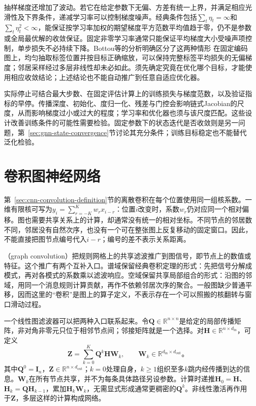 抽样梯度还增加了波动。若它在给定参数下无偏、方差有统一上界，并满足相应光滑性及下界条件，递减学习率可以控制梯度噪声。经典条件包括$\sum_t\eta_t=\infty$和$\sum_t\eta_t^2<\infty$，能保证按学习率加权的期望梯度平方范数平均值趋于零，仍不是参数或全局最优解的收敛保证。固定非零学习率通常只能保证平均梯度大小受噪声项控制，单步损失不必持续下降。Bottou等的分析明确区分了这两种情形 在固定编码图上，均匀抽取标签位置并按目标正确缩放，可以保持完整标签平均损失的无偏梯度；邻居采样经过多层非线性却未必如此。须先确定究竟在优化哪个目标，才能使用相应收敛结论；上述结论也不能自动推广到任意自适应优化器。

实际停止可结合最大步数、在固定评估计算上的训练损失与梯度范数，以及验证指标的早停。传播深度、初始化、度归一化、残差与门控会影响链式Jacobian的尺度，从而影响梯度过小或过大的程度；学习率和优化器也须与该尺度匹配。这些设计改善训练条件的可能性需要检验。固定参数下的状态迭代是否收敛则是另一问题，第~\ref{sec:gnn-state-convergence}节讨论其充分条件；训练目标稳定也不能替代泛化检验。

\section{卷积图神经网络}
\label{sec:gnn-convolutional}

第~\ref{sec:cnn-convolution-definition}节的离散卷积在每个位置使用同一组核系数。一维有限核可写为$y_i=\sum_{r=-K}^{K}w_r x_{i-r}$：位置$i$改变时，系数$w_r$仍对应同一个相对偏移。图也需要共享关系上的计算，却通常没有统一的相对坐标。不同节点的邻居数不同，邻居没有自然次序，也没有一个可在整张图上反复移动的固定窗口。因此，不能直接把图节点编号代入$i-r$；编号的差不表示关系距离。

（graph convolution）把规则网格上的共享滤波推广到图信号，即节点上的数值或特征。这个推广有两个互补入口。谱域保留经典卷积定理的形式：先把信号分解成模式，再对各模式的系数乘以滤波响应。空域保留共享局部组合的形式：沿图的邻域，用同一个消息规则计算贡献，再作不依赖邻居次序的聚合。一般图缺少普通平移，因而这里的“卷积”是图上的算子定义，不表示存在一个可以照搬的核翻转与窗口滑动过程。

一个线性图滤波器可以把两种入口联系起来。令$\bm{Q}\in\mathbb{R}^{n\times n}$是给定的局部传播矩阵，非对角非零元只位于相邻节点间；邻接矩阵就是一个选择。对$\bm{H}\in\mathbb{R}^{n\times d_{\mathrm{in}}}$，可定义
\begin{equation}
  \bm{Z}=\sum_{k=0}^{K}\bm{Q}^{k}\bm{H}\bm{W}_k,
  \qquad \bm{W}_k\in\mathbb{R}^{d_{\mathrm{in}}\times d_{\mathrm{out}}}\text{。}
  \label{eq:gnn-polynomial-convolution}
\end{equation}
其中$\bm{Q}^0=\bm{I}_n$，$\bm{Z}\in\mathbb{R}^{n\times d_{\mathrm{out}}}$；$k=0$处理自身，$k\geq1$组织至多$k$跳内经传播到达的信息。$\bm{W}_k$在所有节点共享，并不为每条具体路径另设参数。计算时递推$\bm{H}_0=\bm{H}$、$\bm{H}_k=\bm{Q}\bm{H}_{k-1}$，累加$\bm{H}_k\bm{W}_k$，无需显式形成通常更稠密的$\bm{Q}^k$。非线性激活再作用于$\bm{Z}$，多层这样的计算构成网络。

